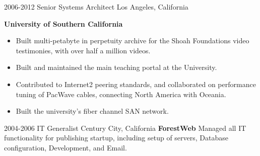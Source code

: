 \begin{entrylist}
{\begin{itemize}
      \end{itemize}
    }
  \entry
    {2006-2012}
    {Senior Systems Architect}
    {Los Angeles, California}
    {
      \textbf{University of Southern California}
      \begin{itemize}
        \item Built multi-petabyte in perpetuity archive for the Shoah Foundations video testimonies, with  over half a million videos. 
        \item Built and maintained the main teaching portal at the University.
        \item Contributed to Internet2 peering standards, and collaborated on performance tuning of PacWave cables, connecting North America with Oceania.
        \item Built the university's fiber channel SAN network.
      \end{itemize}
    }
  \entry
    {2004-2006}
    {IT Generalist}
    {Century City, California}
    {
      \textbf{ForestWeb}
      \newline
     Managed all IT functionality for publishing startup, including setup of servers, Database configuration, Development, and Email.
    }
\end{entrylist}
